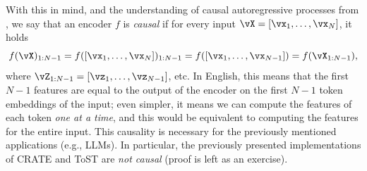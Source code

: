 \documentclass[../../book-main.tex]{subfiles}
\begin{document}
With this in mind, and the understanding of causal autoregressive processes from , we say that an encoder \(f\) is \textit{causal} if for every input \(\vX = [\vx_{1}, \dots, \vx_{N}]\), it holds 
\begin{equation}
    f(\vX)_{1:N-1} = f([\vx_{1}, \dots, \vx_{N}])_{1:N-1} = f([\vx_{1}, \dots, \vx_{N - 1}]) = f(\vX_{1:N-1}),
\end{equation}
where \(\vZ_{1:N-1} = [\vz_{1}, \dots, \vz_{N-1}]\), etc. In English, this means that the first \(N-1\) features are equal to the output of the encoder on the first \(N-1\) token embeddings of the input; even simpler, it means we can compute the features of each token \textit{one at a time}, and this would be equivalent to computing the features for the entire input. This causality is necessary for the previously mentioned applications (e.g., LLMs). In particular, the previously presented implementations of CRATE and ToST are \textit{not causal} (proof is left as an exercise).
\end{document}
